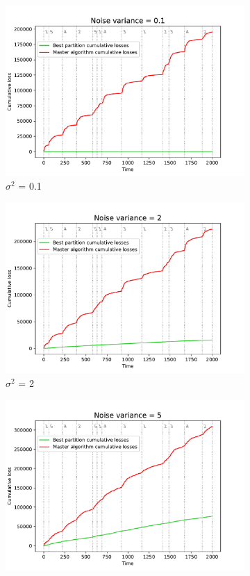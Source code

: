 \documentclass[12pt, twoside]{article}
\begin{document}
\begin{figure}[htb]
    \centering %
\begin{subfigure}{0.33\textwidth}
  \includegraphics[width=\linewidth]{noise_0.1}
  \caption{$\sigma^2$ = 0.1}
  \label{fig:n_1}
\end{subfigure}\hfil %
\begin{subfigure}{0.33\textwidth}
  \includegraphics[width=\linewidth]{noise_2}
  \caption{$\sigma^2$ = 2}
  \label{fig:n_2}
\end{subfigure}\hfil %
\begin{subfigure}{0.33\textwidth}
  \includegraphics[width=\linewidth]{noise_5}

\end{subfigure}
\end{figure}
\end{document}
